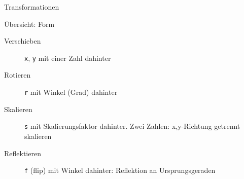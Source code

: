 \documentclass{beamer}
\theoremstyle{example}
\begin{document}
\begin{frame}{Transformationen}
\begin{block}{Übersicht: Form}
  \begin{description}
  \item[Verschieben] \lstinline!x!, \lstinline!y! mit einer Zahl dahinter
  \item[Rotieren] \lstinline!r! mit Winkel (Grad) dahinter
  \item[Skalieren] \lstinline!s! mit Skalierungsfaktor dahinter. Zwei Zahlen: x,y-Richtung getrennt skalieren
  \item[Reflektieren] \lstinline!f! (flip) mit Winkel dahinter: Reflektion an Ursprungsgeraden
  \end{description}
\end{block}
\end{frame}
\end{document}
